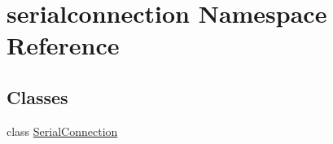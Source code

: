 \hypertarget{namespaceserialconnection}{}\section{serialconnection Namespace Reference}
\label{namespaceserialconnection}
\subsection*{Classes}
\begin{DoxyCompactItemize}
\item 
class \hyperlink{classserialconnection_1_1SerialConnection}{Serial\+Connection}
\end{DoxyCompactItemize}
